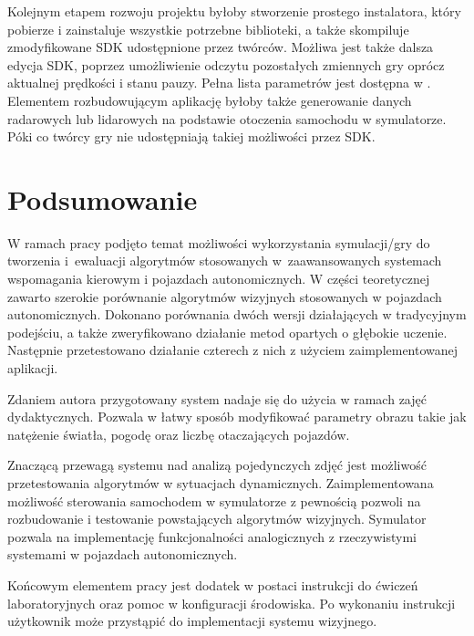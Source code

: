 Kolejnym etapem rozwoju projektu byłoby stworzenie prostego instalatora, który pobierze i zainstaluje wszystkie potrzebne biblioteki, a także skompiluje zmodyfikowane SDK udostępnione przez twórców. 
Możliwa jest także dalsza edycja SDK, poprzez umożliwienie odczytu pozostałych zmiennych gry oprócz aktualnej prędkości i stanu pauzy. 
Pełna lista parametrów jest dostępna w \cite{S3}. 
Elementem rozbudowującym aplikację byłoby także generowanie danych radarowych lub lidarowych na podstawie otoczenia samochodu w symulatorze. 
Póki co twórcy gry nie udostępniają takiej możliwości przez SDK.



\chapter{Podsumowanie}

W ramach pracy podjęto temat możliwości wykorzystania symulacji/gry do tworzenia i~ewaluacji algorytmów stosowanych w~zaawansowanych systemach wspomagania kierowym i pojazdach autonomicznych.
W części teoretycznej zawarto szerokie porównanie algorytmów wizyjnych stosowanych w pojazdach autonomicznych. 
Dokonano porównania dwóch wersji działających w tradycyjnym podejściu, a także zweryfikowano działanie metod opartych o głębokie uczenie. 
Następnie przetestowano działanie czterech z nich z użyciem zaimplementowanej aplikacji. 


Zdaniem autora przygotowany system nadaje się do użycia w ramach zajęć dydaktycznych.
Pozwala w łatwy sposób modyfikować parametry obrazu takie jak natężenie światła, pogodę oraz liczbę otaczających pojazdów. 

Znaczącą przewagą systemu nad analizą pojedynczych zdjęć jest możliwość przetestowania algorytmów w sytuacjach dynamicznych. 
Zaimplementowana możliwość sterowania samochodem w symulatorze z pewnością pozwoli na rozbudowanie i testowanie powstających algorytmów wizyjnych. 
Symulator pozwala na implementację funkcjonalności analogicznych z rzeczywistymi systemami w pojazdach autonomicznych.

Końcowym elementem pracy jest dodatek w postaci instrukcji do ćwiczeń laboratoryjnych oraz pomoc w konfiguracji środowiska. 
Po wykonaniu instrukcji użytkownik może przystąpić do implementacji systemu wizyjnego.

